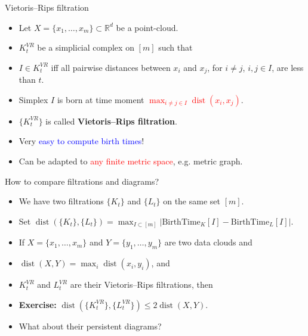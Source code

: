 \documentclass[10pt,xcolor={usenames}]{beamer}
\DeclareMathOperator{\dist}{dist}
\newcommand{\Ro}{\mathbb{R}}
\begin{document}
\begin{frame}{Vietoris--Rips filtration}

\begin{itemize}
  \item Let $X=\{x_1,\ldots,x_m\}\subset \Ro^d$ be a point-cloud.\pause
  \item $K^{VR}_t$ be a simplicial complex on $[m]$ such that
  \item $I\in K^{VR}_t$ iff all pairwise distances between $x_i$ and $x_j$, for $i\neq j$, $i,j\in I$, are less than $t$.
  \item Simplex $I$ is born at time moment \textcolor{red}{$\max_{i\neq j\in I}\dist(x_i,x_j)$}.\pause
  \item $\{K^{VR}_t\}$ is called \textbf{Vietoris--Rips filtration}.\pause
  \item Very \textcolor{blue}{easy to compute birth times}!\pause
  \item Can be adapted to  \textcolor{red}{any finite metric space}, e.g. metric graph.
\end{itemize}

\end{frame}

%
%
%



\begin{frame}{How to compare filtrations and diagrams?}

\begin{itemize}
  \item We have two filtrations $\{K_t\}$ and $\{L_t\}$ on the same set $[m]$.
  \item Set $\dist(\{K_t\},\{L_t\})=\max_{I\subset [m]}|\mbox{BirthTime}_K[I]-\mbox{BirthTime}_L[I]|$.\pause
  \item If $X=\{x_1,\ldots,x_m\}$ and $Y=\{y_1,\ldots,y_m\}$ are two data clouds and
  \item $\dist(X,Y)=\max_i\dist(x_i,y_i)$, and
  \item $K^{VR}_t$ and $L^{VR}_t$ are their Vietoris--Rips filtrations\pause, then
  \item \textbf{Exercise:} $\dist(\{K^{VR}_t\},\{L^{VR}_t\})\leqslant 2\dist(X,Y)$.\pause
  \item What about their persistent diagrams?
\end{itemize}

\end{frame}
\end{document}
